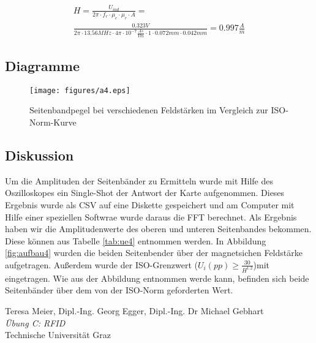 \documentclass[12pt,a4paper,ngerman]{article}
\begin{document}
\begin{gather}
H = \frac{U_{ind}}{2\pi \cdot f_r \cdot \mu_e \cdot \mu_r \cdot A} = \\
\frac{0.323V}{2\pi \cdot 13.56MHz \cdot 4\pi \cdot 10^{-7}\frac{As}{Vm} \cdot 1 \cdot 0.072mm \cdot 0.042mm} = 0.997 \frac{A}{m}
\end{gather}

\subsection{Diagramme}
\begin{figure}[H]
\centering
\texttt{[image: figures/a4.eps]} 
\caption{Seitenbandpegel bei verschiedenen Feldstärken im Vergleich zur ISO-Norm-Kurve}
\label{fig:a4}
\end{figure}

\subsection{Diskussion}
Um die Amplituden der Seitenbänder zu Ermitteln wurde mit Hilfe des Oszilloskopes ein Single-Shot der Antwort der Karte aufgenommen. Dieses Ergebnis wurde als CSV auf eine Diskette gespeichert und am Computer mit Hilfe einer speziellen Softwrae wurde daraus die FFT berechnet. Als Ergebnis haben wir die Amplitudenwerte des oberen und unteren Seitenbandes bekommen. Diese können aus Tabelle \ref{tab:ue4} entnommen werden. In Abbildung \ref{fig:aufbau4} wurden die beiden Seitenbender über der magnetsichen Feldstärke aufgetragen. Außerdem wurde der ISO-Grenzwert ($U_i(pp)\geq\frac{30}{H^{1.2}}$)mit eingetragen. Wie aus der Abbildung entnommen werde kann, befinden sich beide Seitenbänder über dem von der ISO-Norm geforderten Wert.


\begin{thebibliography}{9}

  Teresa Meier, Dipl.-Ing. Georg Egger, Dipl.-Ing. Dr Michael Gebhart\\
  \emph{Übung C: RFID}\\
  Technische Universität Graz
\end{thebibliography}

 



   
\end{document}
